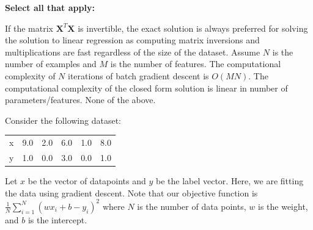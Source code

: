 \documentclass[11pt,addpoints,answers]{exam}
\newcommand{\Xv}{\mathbf{X}}
\begin{document}
\begin{questions}
    \textbf{Select all that apply:}
        {%
    \checkboxchar{$\Box$} \checkedchar{$\blacksquare$}
    \begin{checkboxes}
        \choice If the matrix $\Xv^T\Xv$ is invertible, the exact solution is always preferred for solving the solution to linear regression as computing matrix inversions and multiplications are fast regardless of the size of the dataset.
        \choice Assume $N$ is the number of examples and $M$ is the number of features. The computational complexity of $N$ iterations of batch gradient descent is $O(MN)$.
        \choice The computational complexity of the closed form solution is linear in number of parameters/features.
        \choice None of the above.
    \end{checkboxes}
    }
    
    
    
    \newpage
    
    \question[8] \label{Q7_linear_regression} Consider the following dataset:
    \begin{table}[H]
    \centering
        \begin{tabular}{llllll}
        x & 9.0 & 2.0 & 6.0 & 1.0 & 8.0 \\
        y & 1.0 & 0.0 & 3.0 & 0.0 & 1.0
        \end{tabular}
    \end{table}
    Let $x$ be the vector of datapoints and $y$ be the label vector. Here, we are fitting the data using gradient descent. Note that our objective function is $\frac{1}{N}\sum_{i=1}^N (wx_i + b - y_i)^2$ where $N$ is the number of data points, $w$ is the weight, and $b$ is the intercept.
    
\end{questions}
\end{document}
